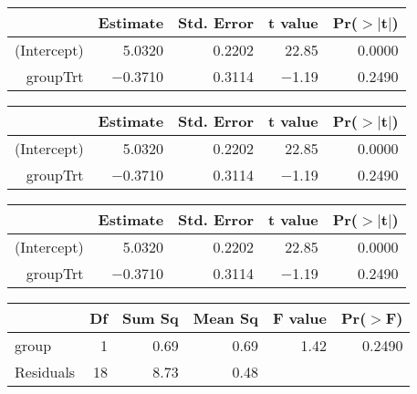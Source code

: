 \documentclass{article}
\begin{document}
\begin{table}[ht]
\begin{tabular}{rrrrr}
\hline
 & Estimate & Std. Error & t value & Pr($>$$|$t$|$) \\
\hline
(Intercept) & 5.0320 & 0.2202 & 22.85 & 0.0000 \\
groupTrt & $-$0.3710 & 0.3114 & $-$1.19 & 0.2490 \\
\hline
\end{tabular}
\end{table}
\begin{table}[ht]
\begin{tabular}{rrrrr}
\hline
 & Estimate & Std. Error & t value & Pr($>$$|$t$|$) \\
\hline
(Intercept) & 5.0320 & 0.2202 & 22.85 & 0.0000 \\
groupTrt & $-$0.3710 & 0.3114 & $-$1.19 & 0.2490 \\
\hline
\end{tabular}
\end{table}
\begin{table}[ht]
\begin{center}
\begin{tabular}{rrrrr}
\hline
 & Estimate & Std. Error & t value & Pr($>$$|$t$|$) \\
\hline
(Intercept) & 5.0320 & 0.2202 & 22.85 & 0.0000 \\
groupTrt & $-$0.3710 & 0.3114 & $-$1.19 & 0.2490 \\
\hline
\end{tabular}
\end{center}
\end{table}
\begin{table}[ht]
\begin{center}
\begin{tabular}{lrrrrr}
\hline
 & Df & Sum Sq & Mean Sq & F value & Pr($>$F) \\
\hline
group & 1 & 0.69 & 0.69 & 1.42 & 0.2490 \\
Residuals & 18 & 8.73 & 0.48 &  &  \\
\hline
\end{tabular}
\end{center}
\end{table}
\end{document}
